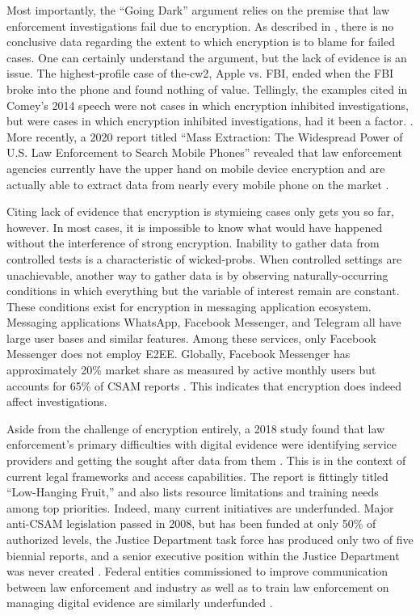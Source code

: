 Most importantly, the ``Going Dark'' argument relies on the premise that law enforcement investigations fail due to
encryption. As described in , there is no conclusive data regarding the extent to which
encryption is to blame for failed cases. One can certainly understand the argument, but the lack of evidence is an
issue. The highest-profile case of \ac{the-cw2}, Apple vs. FBI, ended when the \ac{FBI} broke into the phone and found
nothing of value. Tellingly, the examples cited in Comey's 2014 speech were not cases in which encryption inhibited
investigations, but were cases in which encryption  inhibited investigations, had it been a factor.
\cite{comey_2014}. More recently, a 2020 report titled ``Mass Extraction: The Widespread Power of U.S. Law Enforcement
to Search Mobile Phones'' revealed that law enforcement agencies currently have the upper hand on mobile device
encryption and are actually able to extract data from nearly every mobile phone on the market \cite{koepke_2020}.

Citing lack of evidence that encryption is stymieing cases only gets you so far, however. In most cases, it is
impossible to know what would have happened without the interference of strong encryption. Inability to gather data from
controlled tests is a characteristic of \acp{wicked-prob}. When controlled settings are unachievable, another way to
gather data is by observing naturally-occurring conditions in which everything but the variable of interest remain are
constant. These conditions exist for encryption in messaging application ecosystem. Messaging applications WhatsApp,
Facebook Messenger, and Telegram all have large user bases and similar features. Among these services, only Facebook
Messenger does not employ \ac{E2EE}. Globally, Facebook Messenger has approximately 20\% market share as measured by
active monthly users \cite{statista_2020} but accounts for 65\% of \ac{CSAM} reports \cite{keller_internet_2019}. This
indicates that encryption does indeed affect investigations.


Aside from the challenge of encryption entirely, a 2018 study found that law enforcement's primary difficulties with
digital evidence were identifying service providers and getting the sought after data from them \cite{carter_2018}. This
is in the context of current legal frameworks and access capabilities. The report is fittingly titled ``Low-Hanging
Fruit,'' and also lists resource limitations and training needs among top priorities. Indeed, many current initiatives
are underfunded. Major anti-\ac{CSAM} legislation passed in 2008, but has been funded at only 50\% of authorized levels,
the Justice Department task force has produced only two of five biennial reports, and a senior executive position within
the Justice Department was never created \cite{keller_internet_2019}. Federal entities commissioned to improve
communication between law enforcement and industry as well as to train law enforcement on managing digital evidence are
similarly underfunded \cite{carter_2018}.

